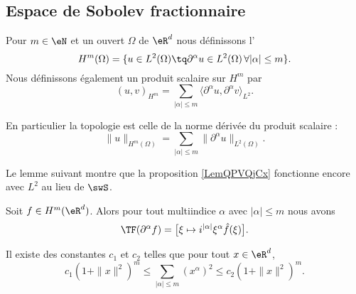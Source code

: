 \subsection{Espace de Sobolev fractionnaire}

\begin{definition}
    Pour \( m\in \eN\) et un ouvert \( \Omega\) de \( \eR^d\) nous définissons l'
    \begin{equation}
        H^m(\Omega)=\{ u\in L^2(\Omega)\tq \partial^{\alpha}u\in L^2(\Omega)\,\forall | \alpha |\leq m \}.
    \end{equation}
    Nous définissons également un produit scalaire sur \( H^m\) par
    \begin{equation}
        (u,v)_{H^m}=\sum_{| \alpha |\leq m}\langle \partial^{\alpha}u,  \partial^{\alpha}v  \rangle_{L^2}.
    \end{equation}
\end{definition}
En particulier la topologie est celle de la norme dérivée du produit scalaire :
\begin{equation}        \label{EQooMCWMooKKTqzM}
    \| u \|_{H^m(\Omega)}=\sum_{| \alpha |\leq m}\| \partial^{\alpha}u \|_{L^2(\Omega)}.
\end{equation}

Le lemme suivant montre que la proposition \ref{LemQPVQjCx} fonctionne encore avec \( L^2\) au lieu de \( \swS\).
\begin{lemma} \label{LEMooAGBZooWCbPDd}
   Soit \( f\in H^m(\eR^d)\). Alors pour tout multiindice \( \alpha\) avec \( | \alpha |\leq m\) nous avons
   \begin{equation}
       \TF(\partial^{\alpha}f)=\big[ \xi\mapsto i^{| \alpha |}\xi^{\alpha}\hat f(\xi) \big].
   \end{equation}
\end{lemma}

\begin{lemma}
    Il existe des constantes \( c_1\) et \( c_2\) telles que pour tout \( x\in \eR^d\),
    \begin{equation}
        c_1(1+\| x \|^2)^m\leq \sum_{| \alpha |\leq m}(x^{\alpha})^2\leq c_2(1+\| x \|^2)^m.
    \end{equation}
\end{lemma}

